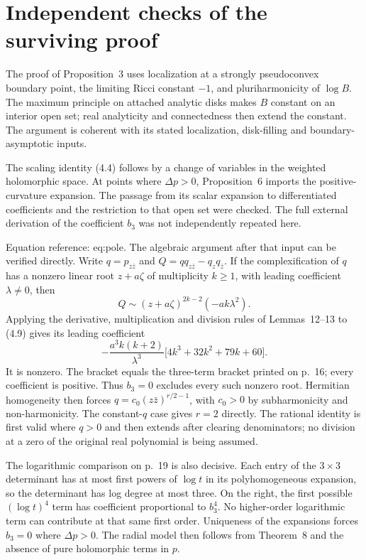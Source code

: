 \documentclass[10pt]{article}
\begin{document}
\section*{Independent checks of the surviving proof}
The proof of Proposition 3 uses localization at a strongly pseudoconvex boundary point, the limiting Ricci constant \(-1\), and pluriharmonicity of \(\log B\). The maximum principle on attached analytic disks makes \(B\) constant on an interior open set; real analyticity and connectedness then extend the constant. The argument is coherent with its stated localization, disk-filling and boundary-asymptotic inputs.\par
The scaling identity (4.4) follows by a change of variables in the weighted holomorphic space. At points where \(\Delta p>0\), Proposition 6 imports the positive-curvature expansion. The passage from its scalar expansion to differentiated coefficients and the restriction to that open set were checked. The full external derivation of the coefficient \(b_3\) was not independently repeated here.\par
Equation reference: eq:pole. The algebraic argument after that input can be verified directly. Write \(q=p_{z\bar z}\) and \(Q=q q_{z\bar z}-q_zq_{\bar z}\). If the complexification of \(q\) has a nonzero linear root \(z+a\zeta\) of multiplicity \(k\ge1\), with leading coefficient \(\lambda\ne0\), then \[Q\sim (z+a\zeta)^{2k-2}(-ak\lambda^2).\] Applying the derivative, multiplication and division rules of Lemmas 12–13 to (4.9) gives its leading coefficient \[-\frac{a^3k(k+2)}{\lambda^3}
 \bigl[4k^3+32k^2+79k+60\bigr].
 \] It is nonzero. The bracket equals the three-term bracket printed on p. 16; every coefficient is positive. Thus \(b_3=0\) excludes every such nonzero root. Hermitian homogeneity then forces \(q=c_0(z\bar z)^{r/2-1}\), with \(c_0>0\) by subharmonicity and non-harmonicity. The constant-\(q\) case gives \(r=2\) directly. The rational identity is first valid where \(q>0\) and then extends after clearing denominators; no division at a zero of the original real polynomial is being assumed.\par
The logarithmic comparison on p. 19 is also decisive. Each entry of the \(3\times3\) determinant has at most first powers of \(\log t\) in its polyhomogeneous expansion, so the determinant has log degree at most three. On the right, the first possible \((\log t)^4\) term has coefficient proportional to \(b_3^4\). No higher-order logarithmic term can contribute at that same first order. Uniqueness of the expansions forces \(b_3=0\) where \(\Delta p>0\). The radial model then follows from Theorem 8 and the absence of pure holomorphic terms in \(p\).\par
\end{document}
